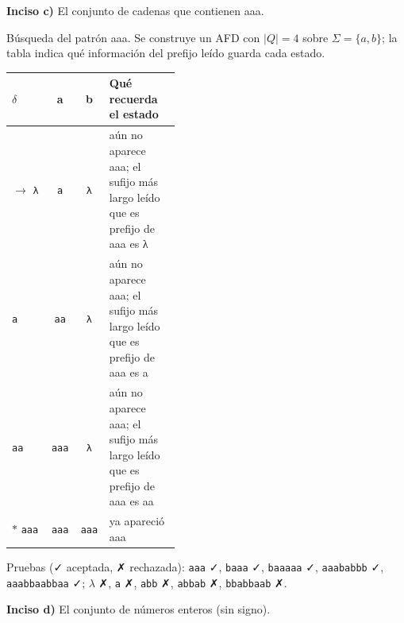 \documentclass[11pt]{article}
\begin{document}
\textbf{Inciso c)} El conjunto de cadenas que contienen aaa.

Búsqueda del patrón aaa. Se construye un AFD con $|Q| = 4$ sobre $\Sigma = \{a, b\}$; la tabla indica qué información del prefijo leído guarda cada estado.
\begin{center}\small\begin{tabular}{lccp{0.42\linewidth}}\toprule
$\delta$ & a & b & Qué recuerda el estado \\\midrule
$\to$ \texttt{λ} & \texttt{a} & \texttt{λ} & aún no aparece aaa; el sufijo más largo leído que es prefijo de aaa es λ \\
 \texttt{a} & \texttt{aa} & \texttt{λ} & aún no aparece aaa; el sufijo más largo leído que es prefijo de aaa es a \\
 \texttt{aa} & \texttt{aaa} & \texttt{λ} & aún no aparece aaa; el sufijo más largo leído que es prefijo de aaa es aa \\
$*$ \texttt{aaa} & \texttt{aaa} & \texttt{aaa} & ya apareció aaa \\
\bottomrule\end{tabular}\end{center}
Pruebas (✓ aceptada, ✗ rechazada): \texttt{aaa} ✓, \texttt{baaa} ✓, \texttt{baaaaa} ✓, \texttt{aaababbb} ✓, \texttt{aaabbaabbaa} ✓; $\lambda$ ✗, \texttt{a} ✗, \texttt{abb} ✗, \texttt{abbab} ✗, \texttt{bbabbaab} ✗.


\textbf{Inciso d)} El conjunto de números enteros (sin signo).
\end{document}
